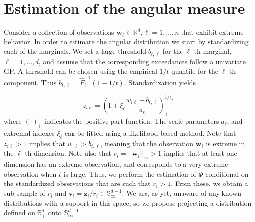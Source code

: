 \section{Estimation of the angular measure\label{sec:methodology}}

Consider a collection of observations $\bm{w}_\ell\in {\mathbb R}^d, \ell=1, \ldots , n$ that exhibit extreme behavior. In order to estimate the angular distribution we start by standardizing each of the marginals. We set a large threshold $b_{t,\ell}$ for the $\ell$-th marginal, $\ell=1, \ldots ,d$, and assume that the corresponding exceedances follow a univariate GP. A threshold can be chosen using the empirical $1/t$-quantile for the $\ell$-th component. Thus $b_{t,\ell} = \hat{F}_\ell^{-1}(1 - 1/t)$. Standardization yields

\begin{equation}
    \label{eqn:standardization}
    z_{i\ell} = \left(1 + \xi_{\ell}\frac{w_{i\ell} - b_{t,\ell}}{a_{\ell}}\right)_{+}^{1/\xi_{\ell}}
\end{equation}
  where $(\cdot)_{+}$ indicates the positive part function. The scale parameters $a_{\ell}$, and extremal indexes $\xi_{\ell}$ can be fitted using a likelihood based method.
 Note that $z_{i\ell} > 1$ implies that $w_{i\ell} > b_{t,\ell}$, meaning that the observation
  $\bm{w}_i$ is extreme in the $\ell$-th dimension.  Note also that $r_i = ||\bm{w}_i||_\infty>1$ implies that at least one dimension has an extreme observation, and corresponds to a very extreme observation when $t$ is large. Thus, we perform the estimation of $\Phi$ conditional on the standardized observations that are such that $r_i>1$. From these, we obtain a sub-sample of $r_i$ and
  $\bm{v}_i = \bm{z}_i/r_i\in{\mathbb S}_{\infty}^{d-1}$. We are, as yet, unaware of any known distributions with a support
  in this space, so we propose projecting a distribution defined on ${\mathbb R}_{+}^{d}$ onto
  ${\mathbb S}_{\infty}^{d-1}$.

  

  

  
